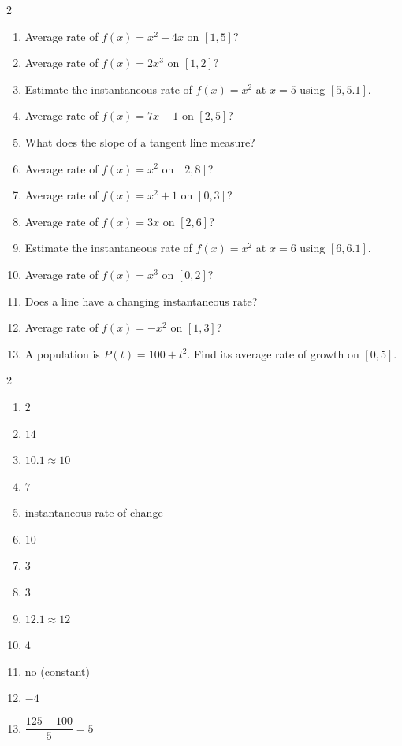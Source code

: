 \documentclass[11pt]{article}
\begin{document}
\begin{recapbox}
\begin{multicols}{2}
\small
\begin{enumerate}[leftmargin=*,itemsep=3pt]
  \item Average rate of $f(x)=x^2-4x$ on $[1,5]$?
  \item Average rate of $f(x)=2x^3$ on $[1,2]$?
  \item Estimate the instantaneous rate of $f(x)=x^2$ at $x=5$ using $[5,5.1]$.
  \item Average rate of $f(x)=7x+1$ on $[2,5]$?
  \item What does the slope of a tangent line measure?
  \item Average rate of $f(x)=x^2$ on $[2,8]$?
  \item Average rate of $f(x)=x^2+1$ on $[0,3]$?
  \item Average rate of $f(x)=3x$ on $[2,6]$?
  \item Estimate the instantaneous rate of $f(x)=x^2$ at $x=6$ using $[6,6.1]$.
  \item Average rate of $f(x)=x^3$ on $[0,2]$?
  \item Does a line have a changing instantaneous rate?
  \item Average rate of $f(x)=-x^2$ on $[1,3]$?
  \item A population is $P(t)=100+t^2$. Find its average rate of growth on $[0,5]$.
\end{enumerate}
\end{multicols}
\end{recapbox}

\begin{keybox}
\begin{multicols}{2}
\small
\begin{enumerate}[leftmargin=*,itemsep=3pt]
  \item $2$
  \item $14$
  \item $10.1\approx10$
  \item $7$
  \item instantaneous rate of change
  \item $10$
  \item $3$
  \item $3$
  \item $12.1\approx12$
  \item $4$
  \item no (constant)
  \item $-4$
  \item $\dfrac{125-100}{5}=5$
\end{enumerate}
\end{multicols}
\end{keybox}
\end{document}
